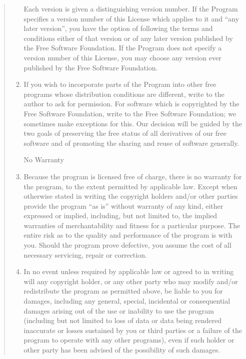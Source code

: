 \documentclass[twoside,11pt]{article}
\renewcommand{\_}{\texttt{\symbol{95}}}
\begin{document}
\begin{quote}
\begin{enumerate}
Each version is given a distinguishing version number.  If the Program
specifies a version number of this License which applies to it and ``any
later version'', you have the option of following the terms and conditions
either of that version or of any later version published by the Free
Software Foundation.  If the Program does not specify a version number of
this License, you may choose any version ever published by the Free Software
Foundation.

\item
If you wish to incorporate parts of the Program into other free
programs whose distribution conditions are different, write to the author
to ask for permission.  For software which is copyrighted by the Free
Software Foundation, write to the Free Software Foundation; we sometimes
make exceptions for this.  Our decision will be guided by the two goals
of preserving the free status of all derivatives of our free software and
of promoting the sharing and reuse of software generally.

\begin{center}
{\Large\sc
No Warranty
}
\end{center}

\item
{\sc Because the program is licensed free of charge, there is no warranty
for the program, to the extent permitted by applicable law.  Except when
otherwise stated in writing the copyright holders and/or other parties
provide the program ``as is'' without warranty of any kind, either expressed
or implied, including, but not limited to, the implied warranties of
merchantability and fitness for a particular purpose.  The entire risk as
to the quality and performance of the program is with you.  Should the
program prove defective, you assume the cost of all necessary servicing,
repair or correction.}

\item
{\sc In no event unless required by applicable law or agreed to in writing
will any copyright holder, or any other party who may modify and/or
redistribute the program as permitted above, be liable to you for damages,
including any general, special, incidental or consequential damages arising
out of the use or inability to use the program (including but not limited
to loss of data or data being rendered inaccurate or losses sustained by
you or third parties or a failure of the program to operate with any other
programs), even if such holder or other party has been advised of the
possibility of such damages.}


\end{enumerate}
\end{quote}
\end{document}
